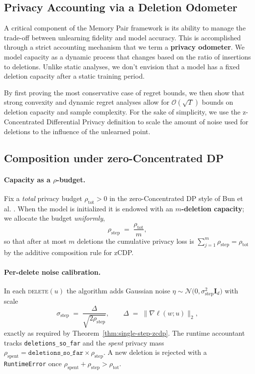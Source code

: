 \documentclass[a4paper,12pt]{article}
\begin{document}
\subsection{Privacy Accounting via a Deletion Odometer}

A critical component of the Memory Pair framework is its ability to manage the trade-off between unlearning fidelity and model accuracy. This is accomplished through a strict accounting mechanism that we term a \textbf{privacy odometer}. We model capacity as a dynamic process that changes based on the ratio of insertions to deletions. Unlike static analyses, we don't envision that a model has a fixed deletion capacity after a static training period.

By first proving the most conservative case of regret bounds, we then show that strong convexity and dynamic regret analyses allow for $\mathcal{O}(\sqrt{T})$ bounds on deletion capacity and sample complexity. For the sake of simplicity, we use the z-Concentrated Differential Privacy definition to scale the amount of noise used for deletions to the influence of the unlearned point.

\subsection{Composition under zero-Concentrated DP}
\label{subsec:zcdp_composition}

\paragraph{Capacity as a {$\rho$}-budget.}
Fix a \emph{total} privacy budget 
\(
  \rho_{\text{tot}}>0
\)
in the zero-Concentrated DP style of Bun et al. \cite{Bun_Steinke_2016}.  
When the model is initialized it is endowed with an
\textbf{$m$-deletion capacity};
we allocate the budget \emph{uniformly},
\[
  \rho_{\text{step}}\;=\;\frac{\rho_{\text{tot}}}{m},
\]
so that after at most \(m\) deletions the cumulative privacy loss is
\(
  \sum_{j=1}^{m}\rho_{\text{step}}
  = \rho_{\text{tot}}
\)
by the additive composition rule for zCDP.

\paragraph{Per-delete noise calibration.}
In each \textsc{delete}$(u)$ the algorithm adds Gaussian noise
\(
  \eta\sim\mathcal{N}\bigl(0,\sigma_{\text{step}}^{2}\mathbf I_d\bigr)
\)
with scale
\[
  \sigma_{\text{step}}
  \;=\;
  \frac{\Delta}{\sqrt{2\rho_{\text{step}}}},
  \qquad
  \Delta\;=\;\bigl\lVert\nabla\ell(w;u)\bigr\rVert_{2},
\]
exactly as required by Theorem~\ref{thm:single-step-zcdp}.
The runtime accountant tracks \texttt{deletions\_so\_far} and the
\emph{spent} privacy mass
\(
  \rho_{\text{spent}} = \texttt{deletions\_so\_far}\times\rho_{\text{step}}.
\)
A new deletion is rejected with a \texttt{RuntimeError} once
\(
  \rho_{\text{spent}} + \rho_{\text{step}} > \rho_{\text{tot}}.
\)
\end{document}

